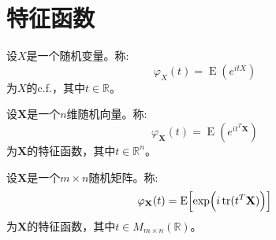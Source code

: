\section{特征函数}


\begin{definition}
	设$X$是一个随机变量。称:
	\begin{equation*}
		\varphi_X(t)=\operatorname{E}(e^{itX})
	\end{equation*}
	为$X$的\gls{c.f.}，其中$t\in\mathbb{R}$。
\end{definition}
\begin{definition}
	设$\mathbf{X}$是一个$n$维随机向量。称:
	\begin{equation*}
		\varphi_\mathbf{X}(t)=\operatorname{E}(e^{it^T\mathbf{X}})
	\end{equation*}
	为$\mathbf{X}$的特征函数，其中$t\in\mathbb{R}^{n}$。
\end{definition}
\begin{definition}
	设$\mathbf{X}$是一个$m\times n$随机矩阵。称:
	\begin{equation*}
		\varphi_\mathbf{X}(t)=\operatorname{E}\Bigl[\exp\Bigl(i\operatorname{tr}(t^T\mathbf{X})\Bigr)\Bigr]
	\end{equation*}
	为$\mathbf{X}$的特征函数，其中$t\in M_{m\times n}(\mathbb{R})$。
\end{definition}
